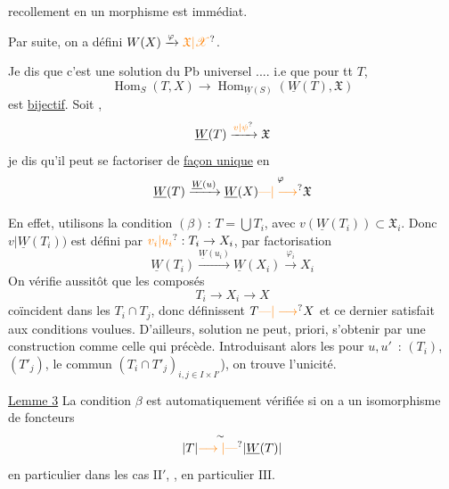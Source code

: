 recollement en un morphisme est immédiat.

Par suite, on a défini $W(X)\xrightarrow{\varphi}\unsure{\mathfrak{X}|\mathscr{X}}$.

Je dis que c'est une solution du Pb universel .... i.e que pour tt $T$,
\[
\operatorname{Hom}_S(T,X)\longrightarrow
\operatorname{Hom}_{\underline W(S)}(\underline W(T),\mathfrak{X})
\]
est \uline{bijectif}. Soit ,
\[
\underline W(T)\xrightarrow{\unsure{v|\psi}}\mathfrak{X}
\]
je dis qu'il peut se factoriser de \uline{façon unique} en
\[
\underline W(T)\xrightarrow{\underline W(u)}\underline W(X)
\overset{\varphi}{\unsure{\text{---}|\longrightarrow}}\mathfrak{X}
\]

En effet,     utilisons la condition $(\beta)$\,: $T=\bigcup T_i$, avec $v(\underline W(T_i))\subset\mathfrak{X}_i$. Donc $v|\underline W(T_i))$ est défini par $\unsure{v_i|u_i}:T_i\to X_i$, par factorisation
\[
\underline W(T_i)\xrightarrow{\underline W(u_i)}
 \underline W(X_i)\xrightarrow{\varphi_i}X_i
\]
On vérifie aussitôt que les composés
\[
 T_i\longrightarrow X_i\longrightarrow X
\]
coïncident dans les $T_i\cap T_j$, donc définissent $T\unsure{\text{---}|\longrightarrow}X$ et ce dernier satisfait aux conditions voulues. D'ailleurs,   solution ne peut,  priori, s'obtenir par une construction comme celle qui précède. Introduisant alors les
pour $u,u'$ \,: $(T_i)$, $(T'_j)$, le  commun $(T_i\cap T'_j)_{i,j\in I\times I'}$), on trouve l'unicité.

\uline{Lemme 3} La condition $\beta$ est automatiquement vérifiée  si on a un isomorphisme de foncteurs
\[
|T|\overset{\sim}{\unsure{\longrightarrow|\text{---}}}|\underline W(T)|
\]
en particulier dans les cas $\mathrm{II}'$, , en particulier $\mathrm{III}$.

